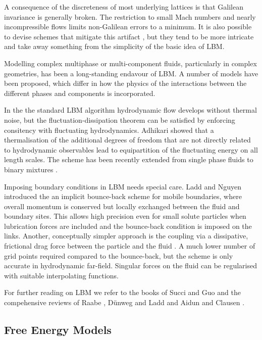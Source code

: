 \documentclass[8.5pt,twoside,twocolumn]{article}
\begin{document}
A consequence of the discreteness of most underlying lattices is that Galilean invariance is generally broken.
The restriction to small Mach numbers and nearly incompressible flows limits non-Galilean errors to a minimum.
It is also possible to devise schemes that mitigate this artifact \cite{Chikatamarla:2006, Dellar:2014},
but they tend to be more intricate and take away something from the simplicity of the basic idea of LBM.

Modelling complex multiphase or multi-component fluids, particularly in complex geometries, 
has been a long-standing endavour of LBM. A number of models have been proposed, which  
differ in how the physics of the interactions between the different phases and components is
incorporated. 

In the the standard LBM algorithm hydrodynamic flow develops without thermal noise, but 
the fluctuation-dissipation theorem can be satisfied by enforcing consitency with 
fluctuating hydrodynamics. Adhikari \cite{Adhikari:2005} showed that a thermalisation of 
the additional degrees of freedom that are not directly related to hydrodynamic observables 
lead to equipartition of the fluctuating energy on all length scales. The scheme has been 
recently extended from single phase fluids \cite{Duenweg:2007} to binary mixtures \cite{Gross:2010}.

Imposing boundary conditions in LBM needs special care. Ladd and Nguyen \cite{Nguyen:2002} 
introduced the an implicit bounce-back scheme for mobile boundaries, where overall momentum is conserved but 
locally exchanged between the fluid and boundary sites. This allows high precision even 
for small solute particles when lubrication forces are included and the bounce-back condition 
is imposed on the links. Another, conceptually simpler approach is the coupling via a dissipative, 
frictional drag force between the particle and the fluid \cite{Ahlrichs:1999}. 
A much lower number of grid points required compared to the bounce-back, but the scheme is only accurate in 
hydrodynamic far-field. Singular forces on the fluid can be regularised with suitable interpolating functions.  

For further reading on LBM we refer to the books of Succi \cite{Succi:2001} and Guo \cite{Guo:2013} and the compehensive reviews of Raabe \cite{Raabe:2004}, D\"unweg and Ladd \cite{Duenweg:2009} and Aidun and Clausen \cite{Aidun:2010}.

\subsection{Free Energy Models}
\end{document}
